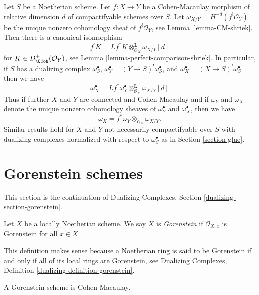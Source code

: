 \begin{remark}
\label{remark-CM-morphism-compare-dualizing}
Let $S$ be a Noetherian scheme. Let $f : X \to Y$ be a
Cohen-Macaulay morphism of relative dimension $d$
of compactifyable schemes over $S$.
Let $\omega_{X/Y} = H^{-d}(f^!\mathcal{O}_Y)$
be the unique nonzero cohomology sheaf of $f^!\mathcal{O}_Y$, see
Lemma \ref{lemma-CM-shriek}.
Then there is a canonical isomorphism
$$
f^!K = Lf^*K \otimes_{\mathcal{O}_X}^\mathbf{L} \omega_{X/Y}[d]
$$
for $K \in D^+_\QCoh(\mathcal{O}_Y)$, see
Lemma \ref{lemma-perfect-comparison-shriek}. In particular, if
$S$ has a dualizing complex $\omega_S^\bullet$,
$\omega_Y^\bullet = (Y \to S)^!\omega_S^\bullet$, and
$\omega_X^\bullet = (X \to S)^!\omega_S^\bullet$
then we have
$$
\omega_X^\bullet =
Lf^*\omega_Y^\bullet \otimes_{\mathcal{O}_X}^\mathbf{L} \omega_{X/Y}[d]
$$
Thus if further $X$ and $Y$ are connected and Cohen-Macaulay and
if $\omega_Y$ and $\omega_X$ denote the unique nonzero cohomology
sheaves of $\omega_Y^\bullet$ and $\omega_X^\bullet$, then we
have
$$
\omega_X = f^*\omega_Y \otimes_{\mathcal{O}_X} \omega_{X/Y}.
$$
Similar results hold for $X$ and $Y$ not necessarily compactifyable
over $S$ with dualizing complexes normalized with respect to
$\omega_S^\bullet$ as in Section \ref{section-glue}.
\end{remark}





\section{Gorenstein schemes}
\label{section-gorenstein}

\noindent
This section is the continuation of Dualizing Complexes, Section
\ref{dualizing-section-gorenstein}.

\begin{definition}
\label{definition-gorenstein}
Let $X$ be a locally Noetherian scheme. We say $X$ is {\it Gorenstein}
if $\mathcal{O}_{X, x}$ is Gorenstein for all $x \in X$.
\end{definition}

\noindent
This definition makes sense because a Noetherian ring is said to
be Gorenstein if and only if all of its local rings are Gorenstein,
see Dualizing Complexes, Definition \ref{dualizing-definition-gorenstein}.

\begin{lemma}
\label{lemma-gorenstein-CM}
A Gorenstein scheme is Cohen-Macaulay.
\end{lemma}

